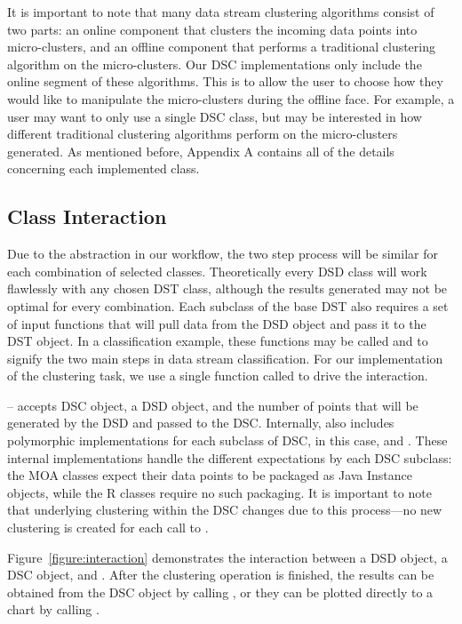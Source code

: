 \documentclass[nojss]{jss}
\begin{document}
It is important to note that many data stream clustering algorithms consist of two parts: an online component that clusters the incoming data points into micro-clusters, and an offline component that performs a traditional clustering algorithm on the micro-clusters. Our DSC implementations only include the online segment of these algorithms. This is to allow the user to choose how they would like to manipulate the micro-clusters during the offline face. For example, a user may want to only use a single DSC class, but may be interested in how different traditional clustering algorithms perform on the micro-clusters generated. As mentioned before, Appendix A contains all of the details concerning each implemented class.


\subsection{Class Interaction}
\label{sec:design:interaction}

Due to the abstraction in our workflow, the two step process will be similar for each combination of selected classes. Theoretically every DSD class will work flawlessly with any chosen DST class, although the results generated may not be optimal for every combination. Each subclass of the base DST also requires a set of input functions that will pull data from the DSD object and pass it to the DST object. In a classification example, these functions may be called  and  to signify the two main steps in data stream classification. For our implementation of the clustering task, we use a single function called  to drive the interaction.


%
 – accepts  DSC object, a DSD object, and the number of points that will be generated by the DSD and passed to the DSC. Internally,  also includes polymorphic implementations for each subclass of DSC, in this case,  and . These internal implementations handle the different expectations by each DSC subclass: the MOA classes expect their data points to be packaged as Java Instance objects, while the R classes require no such packaging. It is important to note that underlying clustering within the DSC changes due to this process—no new clustering is created for each call to .


Figure~\ref{figure:interaction} demonstrates the interaction between a DSD object, a DSC object, and . After the clustering operation is finished, the results can be obtained from the DSC object by calling , or they can be plotted directly to a chart by calling .
\end{document}
